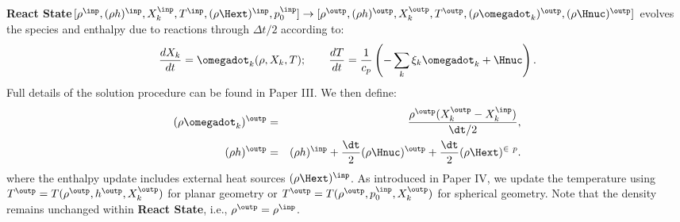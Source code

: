 {\bf React State}$[\rho^{\inp},(\rho                                                                   h)^{\inp},X_k^{\inp},T^{\inp}, (\rho\Hext)^{\inp},                                                      
  p_0^{\inp}] \rightarrow [\rho^{\outp}, (\rho h)^{\outp}, X_k^{\outp},                                   
  T^{\outp}, (\rho \omegadot_k)^{\outp}, (\rho\Hnuc)^{\outp}]$
  evolves the species and enthalpy due to reactions through
  $\Delta t/2$ according to:
\begin{equation}
\frac{dX_k}{dt} = \omegadot_k(\rho,X_k,T) ; \qquad
\frac{dT}{dt}   = \frac{1}{c_p} \left ( -\sum_k \xi_k  \omegadot_k  + \Hnuc \right ).
\end{equation}
Full details of the
solution procedure can be found in Paper III. We then define:
\begin{eqnarray}
(\rho\omegadot_k)^{\outp} &=& \frac{\rho^{\outp} ( X_k^{\outp} - X_k^{\inp})}{\dt/2}, \\
(\rho h)^{\outp} &=& (\rho h)^{\inp} + \frac{\dt}{2} (\rho\Hnuc)^{\outp} + \frac{\dt}{2} (\rho\Hext)^{\in\
p}.
\end{eqnarray}
where the enthalpy update includes external heat sources $(\rho\Hext)^{\inp}$.
As introduced in Paper IV, we update the temperature using $T^{\outp} =                                   
T(\rho^\outp,h^\outp,X_k^\outp)$ for planar geometry or $T^{\outp} =                                      
T(\rho^\outp,p_0^\inp,X_k^\outp)$ for spherical geometry.
Note that the density remains unchanged within {\bf React State}, i.e.,
$\rho^{\outp} = \rho^{\inp}$.


